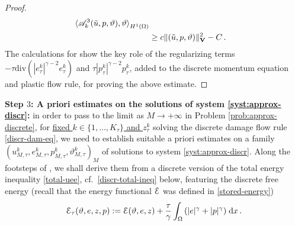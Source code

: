 \documentclass[a4paper,10pt,reqno]{amsart}
\numberwithin{equation}{section}
\newcommand{\R}{\mathbb{R}}
\numberwithin{equation}{section}
\def\dd{\;\!\mathrm{d}} %
\newcommand{\pairing}[4]{ \sideset{_{ #1 }}{_{ #2 }}  {\mathop{\langle #3 , #4
\rangle}}}
\newcommand{\teta}{\vartheta}
\newcommand{\As}{A_{\mathrm{s}}}
\newcommand{\ass}{a_{\mathrm{s}}}
\newcommand{\rbsp}{\mathbf{B}}
\newcommand{\rbspv}{\mathbf{V}}
\newcommand{\ptau}[1]{p_\tau^{#1}}
\newcommand{\ztau}[1]{z_\tau^{#1}}
\newcommand{\etau}[1]{e_\tau^{#1}}
\newcommand{\tetaum}[1]{\teta_{M,\tau}^{#1}}
\newcommand{\utaum}[1]{u_{M,\tau}^{#1}}
\newcommand{\ptaum}[1]{p_{M,\tau}^{#1}}
\newcommand{\etaum}[1]{e_{M,\tau}^{#1}}
\newcommand{\EEE}{\color{black}}
\newcommand{\MMM}{\color{black}}%
\begin{document}
\begin{proof}
\[\begin{aligned}
\begin{aligned}
\pairing{}{H^1(\Omega)}{\mathscr{A}_k^3 (\tilde u,p,\teta)}{\teta} \\ &  \geq c\| (\tilde u,p,\teta)\|_{\rbspv}^2 - C\,.
\end{aligned}
\end{aligned}
 \]
  The calculations for  \cite[Lemma 3.4]{Rossi2016}    show the key role of the regularizing  terms
 $-\tau \mathrm{div}(|\etau k|^{\gamma- 2} \etau k)$  %
 and   $\tau |\ptau k|^{\gamma-2} \ptau k$,
 added  to the discrete momentum equation and plastic flow rule,
  for proving the above  estimate. \EEE
\end{proof}
\par
\noindent 
\textbf{Step $3$:  A priori estimates on the solutions of  system \eqref{syst:approx-discr}:}  in order to 
pass to the limit as $M\to +\infty$ in Problem \ref{prob:approx-discrete}, for  \underline{fixed $k \in \{1,\ldots, K_\tau\}$ and $\ztau k$} solving the discrete damage flow rule
\eqref{discr-dam-eq},
  we need to establish suitable a priori estimates on a family
$(\utaum k, \etaum k,\ptaum k,\tetaum k)_{M}$
 of solutions to system \eqref{syst:approx-discr}. Along the footsteps of 
 \cite{Rossi2016},  we shall  derive them from a
 discrete version of the total energy inequality \eqref{total-uee}, cf.\ \eqref{discr-total-ineq} below,  featuring the discrete \MMM free \EEE energy
 (recall that the energy functional ${\mathcal E}$ was defined in \eqref{stored-energy})
\begin{equation}
\label{discr-total-energy}
\calE_\tau (\teta,e,z,p) : = \calE(\teta,e,z)
 +\frac\tau\gamma \int_\Omega \left(|e|^\gamma + |p|^\gamma \right)  \dd x\,.
\end{equation}
\end{document}
